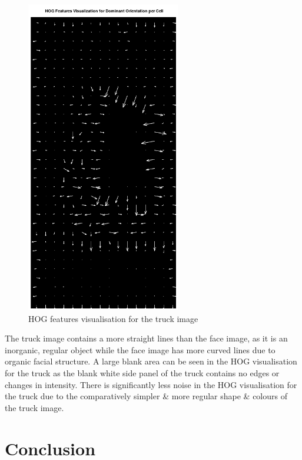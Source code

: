 \documentclass[a4paper]{article}
\begin{document}
\begin{minipage}{0.49\textwidth}
\begin{figure}[H]
    \centering
    \includegraphics[width=0.6\textwidth]{./images/3_hog_features.png}
    \caption{HOG features visualisation for the truck image}
\end{figure}
\end{minipage}

The truck image contains a more straight lines than the face image, as it is an inorganic, regular object while the face image has more curved lines due to organic facial structure.
A large blank area can be seen in the HOG visualisation for the truck as the blank white side panel of the truck contains no edges or changes in intensity.
There is significantly less noise in the HOG visualisation for the truck due to the comparatively simpler \& more regular shape \& colours of the truck image.

\section{Conclusion}
\end{document}
